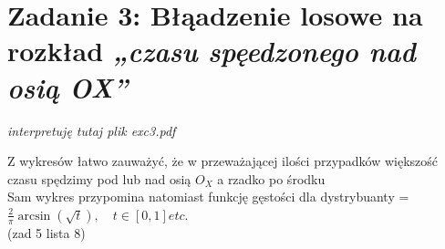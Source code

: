 \documentclass{article}
\begin{document}
\section*{Zadanie 3: Błąadzenie losowe na  rozkład \textit{„czasu spęedzonego nad osią OX”}}

\textit{interpretuję tutaj plik exc3.pdf}

Z wykresów łatwo zauważyć, że w przeważającej ilości przypadków większość czasu spędzimy pod lub nad osią \( O_X \) a rzadko po środku\\
Sam wykres przypomina natomiast funkcję gęstości dla dystrybuanty = \\
\( \frac{2}{\pi} \arcsin\left(\sqrt{t}\right), \quad t \in [0, 1] etc. \)\\
(zad 5 lista 8)
\end{document}
